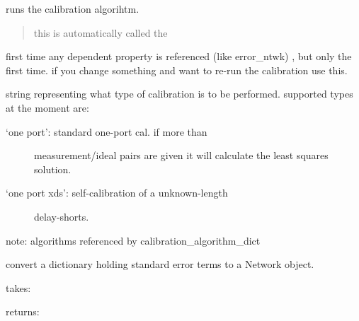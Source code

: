\documentclass[letterpaper,10pt,english]{sphinxmanual}
\begin{document}
\begin{fulllineitems}
\begin{fulllineitems}
\begin{description}
\end{description}

\end{fulllineitems}


\begin{fulllineitems}
\label{api/mwavepy.calibration:mwavepy.calibration.calibration.Calibration.run}
runs the calibration algorihtm.
\begin{quote}

this is automatically called the
\end{quote}

first time      any dependent property is referenced (like error\_ntwk)
, but only the first time. if you change something and want to
re-run the calibration use this.

\end{fulllineitems}


\begin{fulllineitems}
\label{api/mwavepy.calibration:mwavepy.calibration.calibration.Calibration.type}
string representing what type of calibration is to be
performed. supported types at the moment are:
\begin{description}
\item[{`one port':     standard one-port cal. if more than}]  measurement/ideal pairs are given it will
calculate the least squares solution.

\item[{`one port xds': self-calibration of a unknown-length}] \leavevmode
delay-shorts.

\end{description}

note:
algorithms referenced by  calibration\_algorithm\_dict

\end{fulllineitems}


\end{fulllineitems}


\begin{fulllineitems}
\label{api/mwavepy.calibration:mwavepy.calibration.calibration.error_dict_2_network}
convert a dictionary holding standard error terms to a Network
object.

takes:

returns:

\end{fulllineitems}
\end{document}
